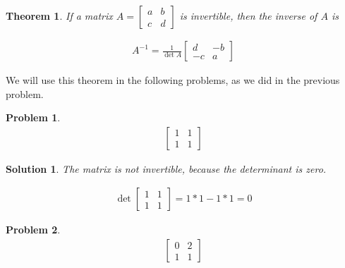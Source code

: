 \documentclass{article}
\newtheorem{theorem}{Theorem}
\newtheorem{problem}{Problem}
\newtheorem*{solution}{Solution}
\begin{document}
\begin{theorem}
If a matrix $A = \begin{bmatrix} a & b \\ c & d \end{bmatrix}$ is invertible, then the inverse of $A$ is

\begin{align*}
A^{-1} = \displaystyle \frac{1}{\det A} \begin{bmatrix} d & -b \\ -c & a \end{bmatrix}
\end{align*}
\end{theorem}

We will use this theorem in the following problems, as we did in the previous problem.

\begin{problem}
\begin{align*}
\begin{bmatrix}
1 & 1 \\ 1 & 1
\end{bmatrix}
\end{align*}
\end{problem}

\begin{solution}
The matrix is not invertible, because the determinant is zero.

\begin{align*}
\det \begin{bmatrix}1 & 1 \\ 1 & 1\end{bmatrix} = 1*1 - 1*1 = 0
\end{align*}

\end{solution}

\begin{problem}
\begin{align*}
\begin{bmatrix}
0 & 2 \\ 1 & 1
\end{bmatrix}
\end{align*}
\end{problem}
\end{document}
